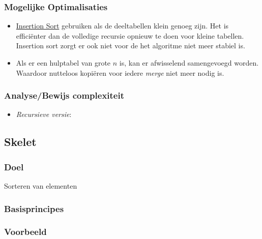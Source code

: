 \documentclass{article}
\begin{document}
\subsubsection{Mogelijke Optimalisaties} %
\label{sub:merge_sort_mogelijke_optimalisaties}
\begin{itemize}
	\item \hyperref[sub:insertion_sort]{Insertion Sort} gebruiken als de deeltabellen klein genoeg zijn. Het is efficiënter dan de volledige recursie opnieuw te doen voor kleine tabellen. Insertion sort zorgt er ook niet voor de het algoritme niet meer stabiel is.
	\item Als er een hulptabel van grote $n$ is, kan er afwisselend samengevoegd worden. Waardoor nutteloos kopiëren voor iedere \textit{merge} niet meer nodig is.
\end{itemize}


\subsubsection{Analyse/Bewijs complexiteit} %
\label{sub:merge_sort_analyse_bewijs_complexiteit}
\begin{itemize}
	\item \textit{Recursieve versie}: 
\end{itemize}




\subsection{Skelet} %
\label{sub:skelet}
\subsubsection{Doel} %
\label{sub:doel}
Sorteren van elementen

\subsubsection{Basisprincipes} %
\label{sub:basisprincipes}


\subsubsection{Voorbeeld} %
\label{sub:voorbeeld}
\end{document}
